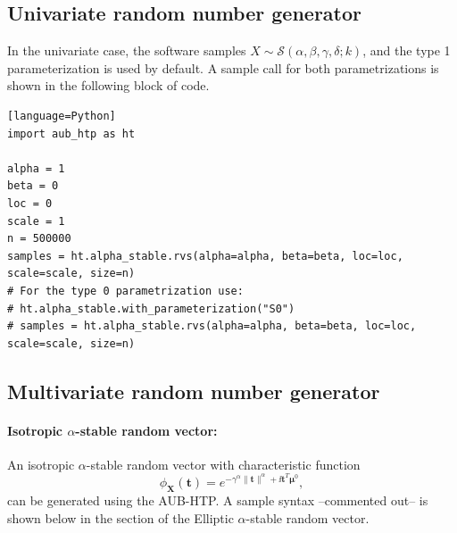 \subsection{Univariate random number generator}
In the univariate case, the software samples $X \sim\mathcal{S}(\alpha,\beta,\gamma,\delta;k)$, and the type 1 parameterization is used by default. A sample call for both parametrizations is shown in the following block of code.
\begin{verbatim}[language=Python]
import aub_htp as ht

alpha = 1
beta = 0
loc = 0
scale = 1
n = 500000
samples = ht.alpha_stable.rvs(alpha=alpha, beta=beta, loc=loc, scale=scale, size=n)
# For the type 0 parametrization use:
# ht.alpha_stable.with_parameterization("S0")
# samples = ht.alpha_stable.rvs(alpha=alpha, beta=beta, loc=loc, scale=scale, size=n)
\end{verbatim}

\subsection{Multivariate random number generator}

\paragraph{Isotropic $\alpha$-stable random vector:} An isotropic $\alpha$-stable random vector with characteristic function
\[
    \phi_{\mathbf{X}}(\mathbf{t})=e^{-\gamma^{\alpha}\|\mathbf{t}\|^{\alpha}
+\ii\mathbf{t}^T\boldsymbol{\mu}^0},
\]
can be generated using the AUB-HTP. A sample syntax --commented out-- is shown below in the section of the Elliptic $\alpha$-stable random vector.

